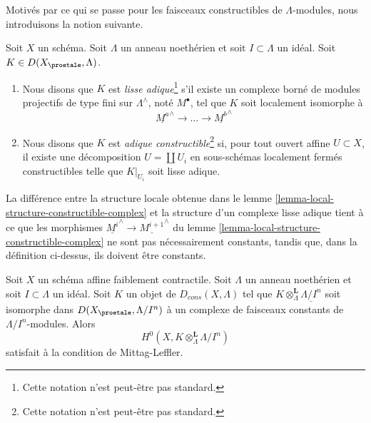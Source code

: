 \noindent
Motivés par ce qui se passe pour les faisceaux constructibles de $\Lambda$-modules,
nous introduisons la notion suivante.

\begin{definition}
\label{definition-adic-constructible}
Soit $X$ un schéma. Soit $\Lambda$ un anneau noethérien et soit
$I \subset \Lambda$ un idéal. Soit $K \in D(X_\proetale, \Lambda)$.
\begin{enumerate}
\item Nous disons que $K$ est {\it lisse adique}\footnote{Cette notation n'est peut-être
pas standard.} s'il existe un complexe borné de modules
projectifs de type fini sur $\Lambda^\wedge$, noté $M^\bullet$, tel que
$K$ soit localement isomorphe à
$$
\underline{M^a}^\wedge \to \ldots \to \underline{M^b}^\wedge
$$
\item Nous disons que $K$ est {\it adique constructible}\footnote{Cette notation n'est peut-être
pas standard.} si, pour tout ouvert affine $U \subset X$,
il existe une décomposition $U = \coprod U_i$ en
sous-schémas localement fermés constructibles telle que $K|_{U_i}$
soit lisse adique.
\end{enumerate}
\end{definition}

\noindent
La différence entre la structure locale obtenue dans le
lemme \ref{lemma-local-structure-constructible-complex}
et la structure d'un complexe lisse adique tient à ce que
les morphismes $\underline{M^i}^\wedge \to \underline{M^{i + 1}}^\wedge$ du
lemme \ref{lemma-local-structure-constructible-complex}
ne sont pas nécessairement constants, tandis que, dans la définition ci-dessus, ils
doivent être constants.

\begin{lemma}
\label{lemma-weakly-contractible-locally-constant-ML}
Soit $X$ un schéma affine faiblement contractile. Soit $\Lambda$ un
anneau noethérien et soit $I \subset \Lambda$ un idéal. Soit $K$ un objet de
$D_{cons}(X, \Lambda)$ tel que
$K \otimes_\Lambda^\mathbf{L} \underline{\Lambda/I^n}$
soit isomorphe dans $D(X_\proetale, \Lambda/I^n)$ à un
complexe de faisceaux constants de $\Lambda/I^n$-modules. Alors
$$
H^0(X, K \otimes_\Lambda^\mathbf{L} \Lambda/I^n)
$$
satisfait à la condition de Mittag-Leffler.
\end{lemma}

